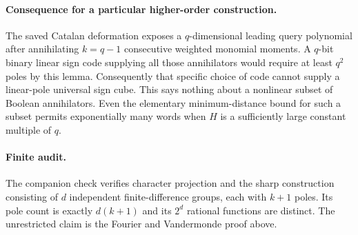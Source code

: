 \documentclass[11pt]{article}
\begin{document}
\paragraph{Consequence for a particular higher-order construction.}
The saved Catalan deformation exposes a $q$-dimensional leading query
polynomial after annihilating $k=q-1$ consecutive weighted monomial
moments. A $q$-bit binary linear sign code supplying all those
annihilators would require at least $q^2$ poles by this lemma.
Consequently that specific choice of code cannot supply a linear-pole
universal sign cube. This says nothing about a nonlinear subset of
Boolean annihilators. Even the elementary minimum-distance bound for
such a subset permits exponentially many words when $H$ is a sufficiently
large constant multiple of $q$.

\paragraph{Finite audit.}
The companion check verifies character projection and the sharp
construction consisting of $d$ independent finite-difference groups,
each with $k+1$ poles. Its pole count is exactly $d(k+1)$ and its
$2^d$ rational functions are distinct. The unrestricted claim is the
Fourier and Vandermonde proof above.
\end{document}
